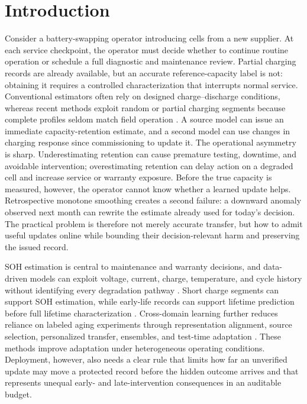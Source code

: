 \documentclass[preprint,12pt]{elsarticle}
\begin{document}
\section{Introduction}

Consider a battery-swapping operator introducing cells from a new supplier. At each service checkpoint, the operator must decide whether to continue routine operation or schedule a full diagnostic and maintenance review. Partial charging records are already available, but an accurate reference-capacity label is not: obtaining it requires a controlled characterization that interrupts normal service. Conventional estimators often rely on designed charge--discharge conditions, whereas recent methods exploit random or partial charging segments because complete profiles seldom match field operation \citep{liu2023rapid,zhang2024flexible}. A source model can issue an immediate capacity-retention estimate, and a second model can use changes in charging response since commissioning to update it. The operational asymmetry is sharp. Underestimating retention can cause premature testing, downtime, and avoidable intervention; overestimating retention can delay action on a degraded cell and increase service or warranty exposure. Before the true capacity is measured, however, the operator cannot know whether a learned update helps. Retrospective monotone smoothing creates a second failure: a downward anomaly observed next month can rewrite the estimate already used for today's decision. The practical problem is therefore not merely accurate transfer, but how to admit useful updates online while bounding their decision-relevant harm and preserving the issued record.

SOH estimation is central to maintenance and warranty decisions, and data-driven models can exploit voltage, current, charge, temperature, and cycle history without identifying every degradation pathway \citep{ng2020mlbattery,roman2021pipeline}. Short charge segments can support SOH estimation, while early-life records can support lifetime prediction before full lifetime characterization \citep{roman2021pipeline,severson2019cyclelife}. Cross-domain learning further reduces reliance on labeled aging experiments through representation alignment, source selection, personalized transfer, ensembles, and test-time adaptation \citep{li2020sstca,ma2022personalized,lu2023without,duan2025wasserstein,feng2024batteryttt}. These methods improve adaptation under heterogeneous operating conditions. Deployment, however, also needs a clear rule that limits how far an unverified update may move a protected record before the hidden outcome arrives and that represents unequal early- and late-intervention consequences in an auditable budget.
\end{document}
